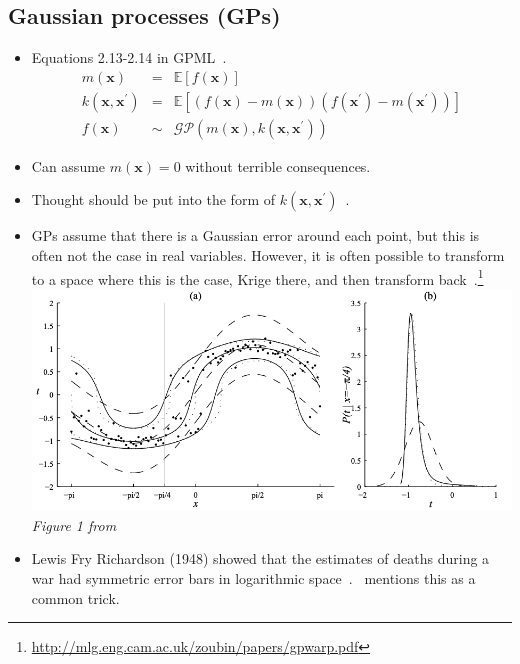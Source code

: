 \subsection{Gaussian processes (GPs)}
\label{sec:gp-theory}
\begin{itemize}
\item Equations 2.13-2.14 in GPML~\cite{williams2006gaussian}.
\begin{align}
m(\mathbf{x})&=&\mathbb{E}[f(\mathbf{x})] %
\\
k\left(\mathbf{x}, \mathbf{x}^{\prime}\right)&=&\mathbb{E}
\left[(f(\mathbf{x})-m(\mathbf{x}))\left(f\left(\mathbf{x}^{\prime}\right)
-m\left(\mathbf{x}^{\prime}\right)\right)\right]
\\
f(\mathbf{x})& \sim& \mathcal{G} \mathcal{P}\left(m(\mathbf{x}),
 k\left(\mathbf{x}, \mathbf{x}^{\prime}\right)\right)%
\end{align}
\item Can assume $m(\mathbf{x})=0$ without terrible consequences.
 \item Thought should be put into the form of $k\left(\mathbf{x},
  \mathbf{x}^{\prime}\right)$~\cite{duvenaud2014automatic}.
\item GPs assume that there is a Gaussian error around each point,
      but this is often not the case in real variables.
      However, it is often possible to transform to
      a space where this is the case, Krige there,
      and then transform
      back~\cite{snelson2004warped}.\footnote{\url{http://mlg.eng.cam.ac.uk/zoubin/papers/gpwarp.pdf}}
      \includegraphics[width=\linewidth]{images/example-images/warped-example.png}\\
      \textit{Figure 1 from~\cite{snelson2004warped}}
\item Lewis Fry Richardson (1948) showed that the estimates
      of deaths during a war had
      symmetric error bars in logarithmic space~\cite{richardson1948variation}.
      \cite{snelson2004warped}~mentions this as a common trick.
 \end{itemize}





